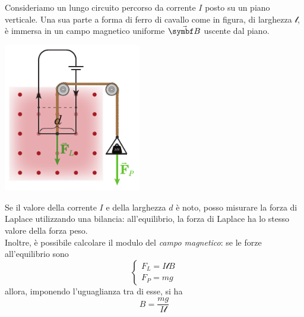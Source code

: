\begin{examplewt}
	Consideriamo un lungo circuito percorso da corrente $I$ posto su un piano verticale. Una sua parte a forma di ferro di cavallo come in figura, di larghezza $\mathcal{l}$, è immersa in un campo magnetico uniforme $\vba{B}$ uscente dal piano.
	\begin{center}
		\includegraphics[width=0.45\textwidth]{images/chp7/chp7bilanciamagnetica.pdf}
	\end{center}
	Se il valore della corrente $I$ e della larghezza $d$ è noto, posso misurare la forza di Laplace utilizzando una bilancia: all'equilibrio, la forza di Laplace ha lo stesso valore della forza peso.\\
	Inoltre, è possibile calcolare il modulo del \textit{campo magnetico}: se le forze all'equilibrio sono
	\begin{equation*}
		\begin{cases}
			F_L=I\mathcal{l}B\\
			F_P=mg
		\end{cases}
	\end{equation*}
	allora, imponendo l'uguaglianza tra di esse, si ha
	\begin{equation*}
		B=\frac{mg}{I\mathcal{l}}
	\end{equation*}
\end{examplewt}

